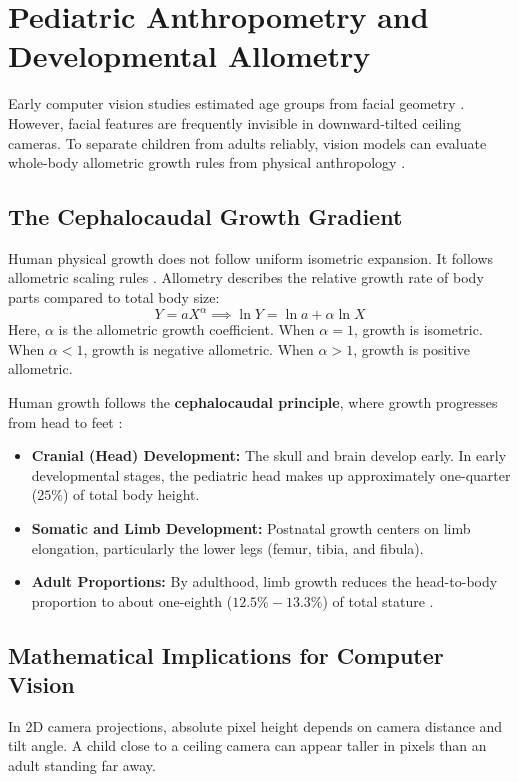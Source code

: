 \section{Pediatric Anthropometry and Developmental Allometry}
Early computer vision studies estimated age groups from facial geometry \cite{kwon1999, liu2020}. However, facial features are frequently invisible in downward-tilted ceiling cameras. To separate children from adults reliably, vision models can evaluate whole-body allometric growth rules from physical anthropology \cite{bogin1999}.

\subsection{The Cephalocaudal Growth Gradient}
Human physical growth does not follow uniform isometric expansion. It follows allometric scaling rules \cite{bogin1999}. Allometry describes the relative growth rate of body parts compared to total body size:
\begin{equation}
    Y = a X^\alpha \implies \ln Y = \ln a + \alpha \ln X
\end{equation}
Here, $\alpha$ is the allometric growth coefficient. When $\alpha = 1$, growth is isometric. When $\alpha < 1$, growth is negative allometric. When $\alpha > 1$, growth is positive allometric.

Human growth follows the \textbf{cephalocaudal principle}, where growth progresses from head to feet \cite{bogin1999, mlinaric2024}:
\begin{itemize}
    \item \textbf{Cranial (Head) Development:} The skull and brain develop early. In early developmental stages, the pediatric head makes up approximately one-quarter ($25\%$) of total body height.
    \item \textbf{Somatic and Limb Development:} Postnatal growth centers on limb elongation, particularly the lower legs (femur, tibia, and fibula).
    \item \textbf{Adult Proportions:} By adulthood, limb growth reduces the head-to-body proportion to about one-eighth ($12.5\% - 13.3\%$) of total stature \cite{mlinaric2024}.
\end{itemize}

\subsection{Mathematical Implications for Computer Vision}
In 2D camera projections, absolute pixel height depends on camera distance and tilt angle. A child close to a ceiling camera can appear taller in pixels than an adult standing far away.

